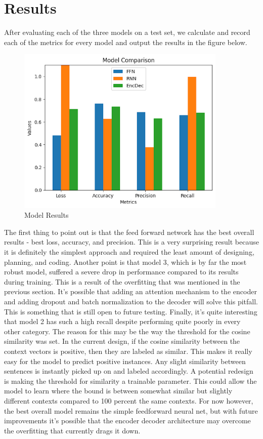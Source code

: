 \documentclass{article}
\begin{document}
\section{Results}
After evaluating each of the three models on a test set, we calculate and record each of the metrics for every model and output the results in the figure below.
\begin{figure}[htp]
    \centering
    \includegraphics[width=10cm]{results.png}
    \caption{Model Results}
\end{figure}
The first thing to point out is that the feed forward network has the best overall results - best loss, accuracy, and precision. This is a very surprising result because it is definitely the simplest approach and required the least amount of designing, planning, and coding. Another point is that model 3, which is by far the most robust model, suffered a severe drop in performance compared to its results during training. This is a result of the overfitting that was mentioned in the previous section. It's possible that adding an attention mechanism to the encoder and adding dropout and batch normalization to the decoder will solve this pitfall. This is something that is still open to future testing. Finally, it's quite interesting that model 2 has such a high recall despite performing quite poorly in every other category. The reason for this may be the way the threshold for the cosine similarity was set. In the current design, if the cosine similarity between the context vectors is positive, then they are labeled as similar. This makes it really easy for the model to predict positive instances. Any slight similarity between sentences is instantly picked up on and labeled accordingly. A potential redesign is making the threshold for similarity a trainable parameter. This could allow the model to learn where the bound is between somewhat similar but slightly different contexts compared to 100 percent the same contexts. For now however, the best overall model remains the simple feedforward neural net, but with future improvements it's possible that the encoder decoder architecture may overcome the overfitting that currently drags it down.
\end{document}

